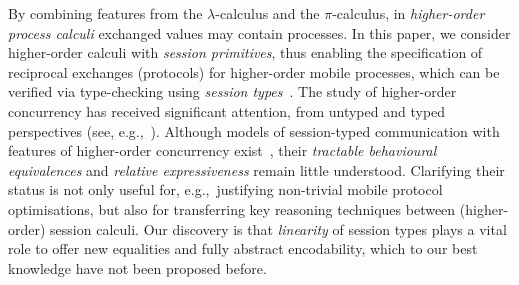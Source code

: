 \noi 
By combining features from the $\lambda$-calculus and the $\pi$-calculus, 
in \emph{higher-order process calculi} exchanged values may contain  processes. 
In this paper, we consider higher-order calculi with \emph{session primitives},
thus enabling the specification of reciprocal exchanges (protocols) 
for higher-order mobile processes, 
which can be verified via type-checking using \emph{session types}~\cite{honda.vasconcelos.kubo:language-primitives}.
The study of higher-order concurrency has received significant attention, 
from untyped and typed perspectives (see, e.g.,~\cite{ThomsenB:plachoasgcfhop,SangiorgiD:expmpa,San96int,JeffreyR05,MostrousY15,DBLP:journals/iandc/LanesePSS11,DBLP:conf/icalp/LanesePSS10,DBLP:conf/esop/KoutavasH11,XuActa2012}).
Although models of session-typed 
communication with features of higher-order concurrency exist~\cite{tlca07,DBLP:journals/jfp/GayV10},
their  \emph{tractable behavioural equivalences} and \emph{relative expressiveness}
remain little understood. 
Clarifying their status is not only useful for, 
e.g.,~justifying non-trivial mobile protocol
optimisations, but also for transferring key reasoning techniques
between (higher-order) session calculi. Our discovery 
is that \emph{linearity} of session types plays a vital role to 
offer new equalities and fully abstract encodability, 
which to our best knowledge have not been proposed before.   

